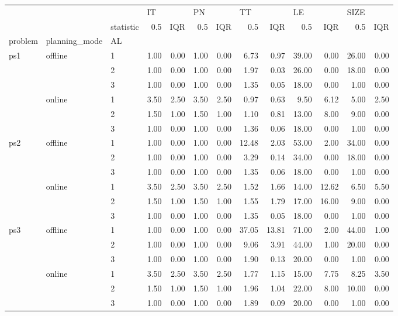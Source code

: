 \begin{tabular}{lllrrrrrrrrrr}
\toprule
    &        & {} & \multicolumn{2}{l}{IT} & \multicolumn{2}{l}{PN} & \multicolumn{2}{l}{TT} & \multicolumn{2}{l}{LE} & \multicolumn{2}{l}{SIZE} \\
    &        & statistic &  0.5 &  IQR &  0.5 &  IQR &   0.5 &   IQR &   0.5 &   IQR &   0.5 &  IQR \\
problem & planning\_mode & AL &      &      &      &      &       &       &       &       &       &      \\
\midrule
ps1 & offline & 1 & 1.00 & 0.00 & 1.00 & 0.00 &  6.73 &  0.97 & 39.00 &  0.00 & 26.00 & 0.00 \\
    &        & 2 & 1.00 & 0.00 & 1.00 & 0.00 &  1.97 &  0.03 & 26.00 &  0.00 & 18.00 & 0.00 \\
    &        & 3 & 1.00 & 0.00 & 1.00 & 0.00 &  1.35 &  0.05 & 18.00 &  0.00 &  1.00 & 0.00 \\
    & online & 1 & 3.50 & 2.50 & 3.50 & 2.50 &  0.97 &  0.63 &  9.50 &  6.12 &  5.00 & 2.50 \\
    &        & 2 & 1.50 & 1.00 & 1.50 & 1.00 &  1.10 &  0.81 & 13.00 &  8.00 &  9.00 & 0.00 \\
    &        & 3 & 1.00 & 0.00 & 1.00 & 0.00 &  1.36 &  0.06 & 18.00 &  0.00 &  1.00 & 0.00 \\
ps2 & offline & 1 & 1.00 & 0.00 & 1.00 & 0.00 & 12.48 &  2.03 & 53.00 &  2.00 & 34.00 & 0.00 \\
    &        & 2 & 1.00 & 0.00 & 1.00 & 0.00 &  3.29 &  0.14 & 34.00 &  0.00 & 18.00 & 0.00 \\
    &        & 3 & 1.00 & 0.00 & 1.00 & 0.00 &  1.35 &  0.06 & 18.00 &  0.00 &  1.00 & 0.00 \\
    & online & 1 & 3.50 & 2.50 & 3.50 & 2.50 &  1.52 &  1.66 & 14.00 & 12.62 &  6.50 & 5.50 \\
    &        & 2 & 1.50 & 1.00 & 1.50 & 1.00 &  1.55 &  1.79 & 17.00 & 16.00 &  9.00 & 0.00 \\
    &        & 3 & 1.00 & 0.00 & 1.00 & 0.00 &  1.35 &  0.05 & 18.00 &  0.00 &  1.00 & 0.00 \\
ps3 & offline & 1 & 1.00 & 0.00 & 1.00 & 0.00 & 37.05 & 13.81 & 71.00 &  2.00 & 44.00 & 1.00 \\
    &        & 2 & 1.00 & 0.00 & 1.00 & 0.00 &  9.06 &  3.91 & 44.00 &  1.00 & 20.00 & 0.00 \\
    &        & 3 & 1.00 & 0.00 & 1.00 & 0.00 &  1.90 &  0.13 & 20.00 &  0.00 &  1.00 & 0.00 \\
    & online & 1 & 3.50 & 2.50 & 3.50 & 2.50 &  1.77 &  1.15 & 15.00 &  7.75 &  8.25 & 3.50 \\
    &        & 2 & 1.50 & 1.00 & 1.50 & 1.00 &  1.96 &  1.04 & 22.00 &  8.00 & 10.00 & 0.00 \\
    &        & 3 & 1.00 & 0.00 & 1.00 & 0.00 &  1.89 &  0.09 & 20.00 &  0.00 &  1.00 & 0.00 \\
\bottomrule
\end{tabular}
